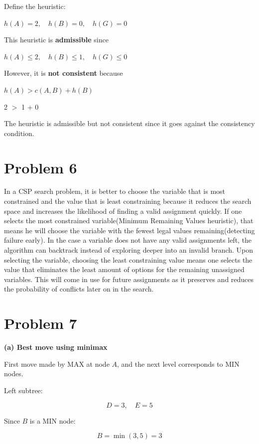 \documentclass{article}
\begin{document}
Define the heuristic:

$h(A)=2, \quad h(B)=0, \quad h(G)=0$


This heuristic is \textbf{admissible} since

$h(A) \le 2, \quad h(B) \le 1, \quad h(G) \le 0$

However, it is \textbf{not consistent} because

$h(A) > c(A,B) + h(B)$

2 $>$ 1 + 0 \\

\begin{center}
   The heuristic is admissible but not consistent since it goes against the consistency condition.
\end{center}







\section*{Problem 6}
In a CSP search problem, it is better to choose the variable that is most constrained and the value that is least constraining because it reduces the search space and increases the likelihood of finding a valid assignment quickly. If one selects the most constrained variable(Minimum Remaining Values heuristic), that means he will choose the variable with the fewest legal values remaining(detecting failure early). In the case a variable does not have any valid assignments left, the algorithm can backtrack instead of exploring deeper into an invalid branch. Upon selecting the variable, choosing the least constraining value means one selects the value that eliminates the least amount of options for the remaining unassigned variables. This will come in use for future assignments as it preserves and reduces the probability of conflicts later on in the search.

\section*{Problem 7}
\textbf{(a) Best move using minimax}

First move made by MAX at node $A$, and the next level corresponds to MIN nodes.

Left subtree:

\[
D = 3, \quad E = 5
\]

Since $B$ is a MIN node:

\[
B = \min(3,5) = 3
\]
\end{document}
